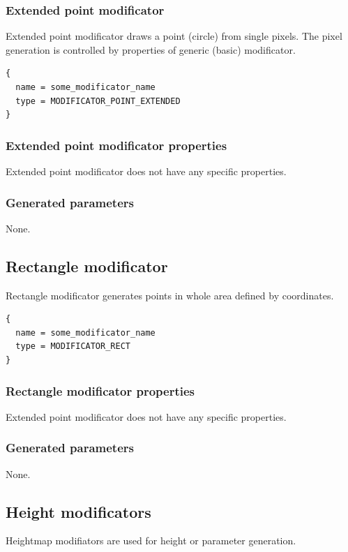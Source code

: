 \documentclass[9pt]{article}
\begin{document}
\newpage
\subsubsection{Extended point modificator}

Extended point modificator draws a point (circle)
from single pixels. The pixel generation is controlled by 
properties of generic (basic) modificator.

\begin{verbatim}
{
  name = some_modificator_name
  type = MODIFICATOR_POINT_EXTENDED
}
\end{verbatim}
\subsubsection*{Extended point modificator properties}
Extended point modificator does not have any specific properties.
\subsubsection*{Generated parameters}

None.

\newpage
\subsection{Rectangle modificator}

Rectangle modificator generates points in whole area defined by coordinates.
\begin{verbatim}
{
  name = some_modificator_name
  type = MODIFICATOR_RECT
}
\end{verbatim}
\subsubsection*{Rectangle modificator properties}
Extended point modificator does not have any specific properties.
\subsubsection*{Generated parameters}

None.

\newpage
\subsection{Height modificators}

Heightmap modifiators are used for height or parameter generation.
\end{document}
